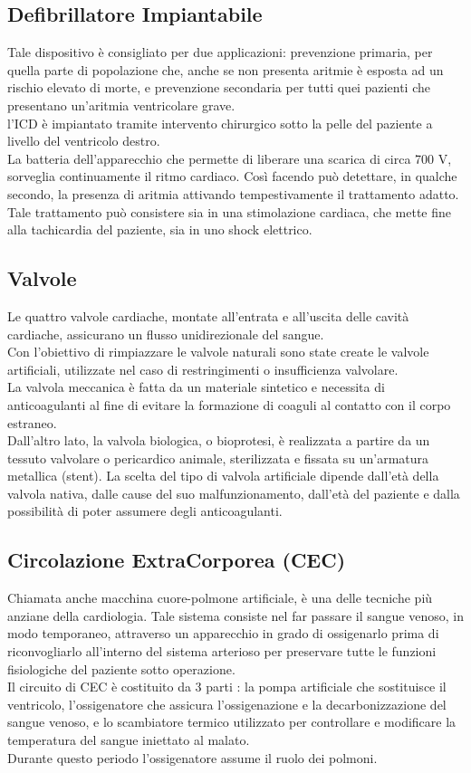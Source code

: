 \documentclass[a4paper]{article}
\begin{document}
\subsection{Defibrillatore Impiantabile}
Tale dispositivo è consigliato per due applicazioni: prevenzione primaria, 
per quella parte di popolazione che, anche se non presenta aritmie è esposta 
ad un rischio elevato di morte, e prevenzione secondaria per tutti quei 
pazienti che presentano un’aritmia ventricolare grave. \\
l’ICD è impiantato tramite intervento chirurgico sotto la pelle del 
paziente a livello del ventricolo destro. \\
La batteria dell’apparecchio che permette di liberare una scarica di circa 
700 V, sorveglia continuamente il ritmo cardiaco.
Così facendo può detettare, in qualche secondo, la presenza di aritmia 
attivando tempestivamente il trattamento adatto. Tale trattamento può 
consistere sia in una stimolazione cardiaca, che mette fine alla
tachicardia del paziente, sia in uno shock elettrico.

\subsection{Valvole}
Le quattro valvole cardiache, montate all’entrata e all’uscita delle cavità 
cardiache, assicurano un flusso unidirezionale del sangue. \\
Con l'obiettivo di rimpiazzare le valvole naturali sono state create le 
valvole artificiali, utilizzate nel caso di restringimenti o insufficienza
valvolare. \\
La valvola meccanica è fatta da un materiale sintetico e necessita di 
anticoagulanti al fine di evitare la formazione di coaguli al contatto con 
il corpo estraneo. \\
Dall’altro lato, la valvola biologica, o bioprotesi, è realizzata a partire 
da un tessuto valvolare o pericardico animale, sterilizzata e fissata su 
un’armatura metallica (stent).
La scelta del tipo di valvola artificiale dipende dall’età della valvola 
nativa, dalle cause del suo malfunzionamento, dall’età del paziente e dalla 
possibilità di poter assumere degli anticoagulanti.

\subsection{Circolazione ExtraCorporea (CEC)}
Chiamata anche macchina cuore-polmone artificiale, è una delle tecniche più 
anziane della cardiologia. Tale sistema consiste nel far passare il sangue 
venoso, in modo temporaneo, attraverso un apparecchio in grado di 
ossigenarlo prima di riconvogliarlo all’interno del sistema arterioso per 
preservare tutte le funzioni fisiologiche del paziente sotto operazione. \\
Il circuito di CEC è costituito da 3 parti : la pompa artificiale che 
sostituisce il ventricolo, l’ossigenatore che assicura l’ossigenazione e 
la decarbonizzazione del sangue venoso, e lo scambiatore termico utilizzato 
per controllare e modificare la temperatura del sangue iniettato al malato. \\
Durante questo periodo l’ossigenatore assume il ruolo dei polmoni.
\end{document}
